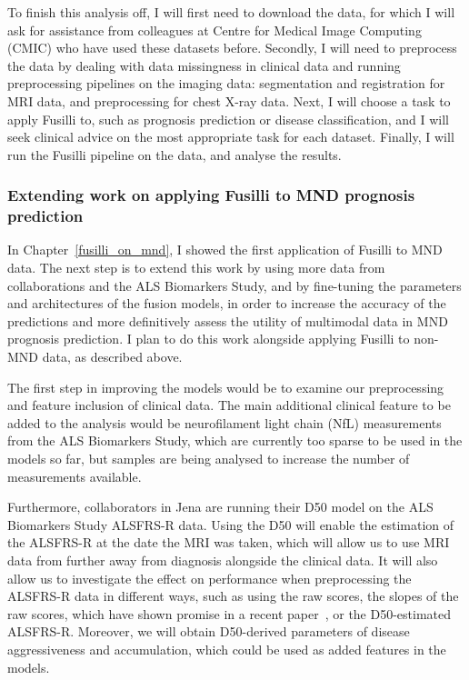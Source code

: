 To finish this analysis off, I will first need to download the data, for which I will ask for assistance from colleagues at Centre for Medical Image Computing (CMIC) who have used these datasets before.
Secondly, I will need to preprocess the data by dealing with data missingness in clinical data and running preprocessing pipelines on the imaging data: segmentation and registration for MRI data, and preprocessing for chest X-ray data.
Next, I will choose a task to apply Fusilli to, such as prognosis prediction or disease classification, and I will seek clinical advice on the most appropriate task for each dataset.
Finally, I will run the Fusilli pipeline on the data, and analyse the results.

\subsubsection*{Extending work on applying Fusilli to MND prognosis prediction}

In Chapter~\ref{fusilli_on_mnd}, I showed the first application of Fusilli to MND data.
The next step is to extend this work by using more data from collaborations and the ALS Biomarkers Study, and by fine-tuning the parameters and architectures of the fusion models, in order to increase the accuracy of the predictions and more definitively assess the utility of multimodal data in MND prognosis prediction.
I plan to do this work alongside applying Fusilli to non-MND data, as described above.

The first step in improving the models would be to examine our preprocessing and feature inclusion of clinical data.
The main additional clinical feature to be added to the analysis would be neurofilament light chain (NfL) measurements from the ALS Biomarkers Study, which are currently too sparse to be used in the models so far, but samples are being analysed to increase the number of measurements available.

Furthermore, collaborators in Jena are running their D50 model on the ALS Biomarkers Study ALSFRS-R data.
Using the D50 will enable the estimation of the ALSFRS-R at the date the MRI was taken, which will allow us to use MRI data from further away from diagnosis alongside the clinical data.
It will also allow us to investigate the effect on performance when preprocessing the ALSFRS-R data in different ways, such as using the raw scores, the slopes of the raw scores, which have shown promise in a recent paper~\cite{papaizEnsembleimbalancebasedClassificationAmyotrophic2024}, or the D50-estimated ALSFRS-R.
Moreover, we will obtain D50-derived parameters of disease aggressiveness and accumulation, which could be used as added features in the models.

